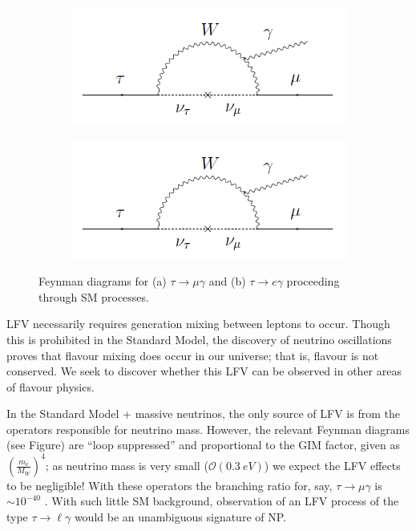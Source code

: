 \documentclass[12pt]{thesis}  %
\newcommand{\tmg}{\tau\to\mu\gamma}
\newcommand{\tlg}{\tau\to\ell\gamma}
\begin{document}
   \begin{figure}[h]
        \centering
        \begin{subfigure}[b]{0.475\textwidth}
            \centering
            \includegraphics[width=\textwidth]{images/tauMG-feynman.png}
            \caption[Network2]%
            {{\small}}    
            \label{fig:mean and std of net14}
        \end{subfigure}
        \hfill
        \begin{subfigure}[b]{0.475\textwidth}  
            \centering 
            \includegraphics[width=\textwidth]{images/tauEG-feynman.png}
            \caption[]%
            {{\small}}    
            \label{fig:mean and std of net24}
        \end{subfigure}
        \caption{Feynman diagrams for (a) $\tau\to\mu\gamma$ and (b) $\tau\to e\gamma$ proceeding through SM processes.}
    \end{figure}

LFV necessarily requires generation mixing between leptons to occur. Though this is prohibited in the Standard Model, the discovery of neutrino oscillations proves that flavour mixing does occur in our universe; that is, flavour is not conserved. We seek to discover whether this LFV can be observed in other areas of flavour physics.

In the Standard Model + massive neutrinos, the only source of LFV is from the operators responsible for neutrino mass. However, the relevant Feynman diagrams (see Figure) are ``loop suppressed'' and proportional to the GIM factor, given as $\left(\frac{m_\nu}{M_W}\right)^4$; as neutrino mass is very small ($\mathcal{O}(\SI{0.3}{eV})$) we expect the LFV effects to be negligible! With these operators the branching ratio for, say, $\tmg$ is $\sim 10^{-40}$ \cite{Passemar:2015}. With such little SM background, observation of an LFV process of the type $\tlg$ would be an unambiguous signature of NP.
\end{document}
